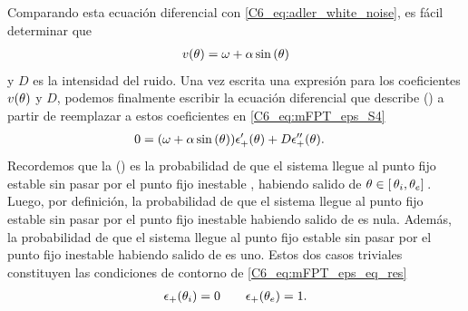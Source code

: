 \documentclass[./main.tex]{subfiles}
\begin{document}
Comparando esta ecuación diferencial con \ref{C6_eq:adler_white_noise}, es fácil determinar que 
\begin{align}
    v(\theta) = \omega + \alpha \sin{(\ensuremath{\theta})}  \label{C6_eq:mFPT_eps_def_vD_solved}
\end{align}
y $D$ es la intensidad del ruido. Una vez escrita una expresión para los coeficientes $v(\theta)$ y $D$, podemos finalmente escribir la ecuación diferencial que describe \epsplus(\xx) a partir de reemplazar a estos coeficientes en \ref{C6_eq:mFPT_eps_S4}
\begin{align}
     0 &=  (\omega + \alpha \sin{(\ensuremath{\theta})}) \epsilon_{+}'(\theta) + D \epsilon_{+}''(\theta) .
     \label{C6_eq:mFPT_eps_eq_res}
\end{align}
Recordemos que la \epsplus(\xx) es la probabilidad de que el sistema llegue al punto fijo estable \xxe sin pasar por el punto fijo inestable \xxi, habiendo salido de $ \theta  \in [ \,\theta_i,\theta_e ]\,$. Luego, por definición, la probabilidad de que el sistema llegue al punto fijo estable \xxe sin pasar por el punto fijo inestable \xxi habiendo salido de \xxi es nula. Además, la probabilidad de que el sistema llegue al punto fijo estable \xxe sin pasar por el punto fijo inestable \xxi habiendo salido de \xxe es uno. Estos dos casos triviales constituyen las condiciones de contorno de \ref{C6_eq:mFPT_eps_eq_res}
\begin{align}
    \epsilon_{+}(\theta_i) = 0 \qquad \epsilon_{+}(\theta_e) = 1.
    \label{C6_eq:mFPT_eps_cdc}
\end{align}
\end{document}
